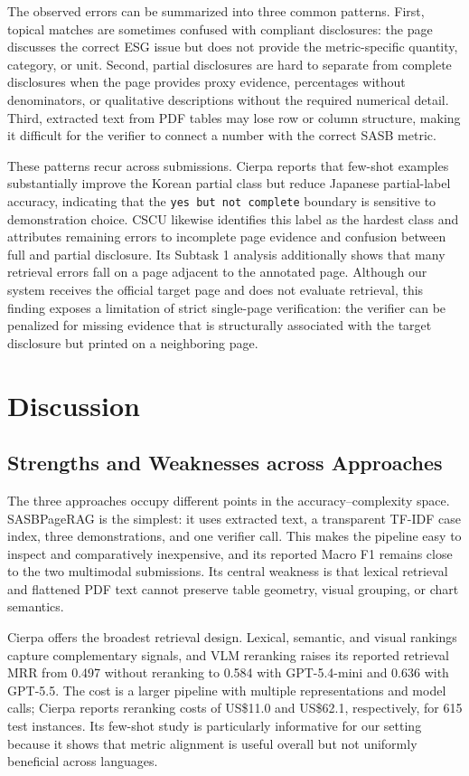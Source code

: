 \documentclass[sigconf,article]{acmart}
\newcommand{\SASBPageRAG}{SASB\-Page\-RAG}
\begin{document}
The observed errors can be summarized into three common patterns. First, topical matches are sometimes confused with compliant disclosures: the page discusses the correct ESG issue but does not provide the metric-specific quantity, category, or unit. Second, partial disclosures are hard to separate from complete disclosures when the page provides proxy evidence, percentages without denominators, or qualitative descriptions without the required numerical detail. Third, extracted text from PDF tables may lose row or column structure, making it difficult for the verifier to connect a number with the correct SASB metric.

These patterns recur across submissions. Cierpa reports that few-shot examples substantially improve the Korean partial class but reduce Japanese partial-label accuracy, indicating that the \texttt{yes but not complete} boundary is sensitive to demonstration choice. CSCU likewise identifies this label as the hardest class and attributes remaining errors to incomplete page evidence and confusion between full and partial disclosure. Its Subtask 1 analysis additionally shows that many retrieval errors fall on a page adjacent to the annotated page. Although our system receives the official target page and does not evaluate retrieval, this finding exposes a limitation of strict single-page verification: the verifier can be penalized for missing evidence that is structurally associated with the target disclosure but printed on a neighboring page.

\section{Discussion}
\subsection{Strengths and Weaknesses across Approaches}
The three approaches occupy different points in the accuracy--complexity space. \SASBPageRAG{} is the simplest: it uses extracted text, a transparent TF-IDF case index, three demonstrations, and one verifier call. This makes the pipeline easy to inspect and comparatively inexpensive, and its reported Macro F1 remains close to the two multimodal submissions. Its central weakness is that lexical retrieval and flattened PDF text cannot preserve table geometry, visual grouping, or chart semantics.

Cierpa offers the broadest retrieval design. Lexical, semantic, and visual rankings capture complementary signals, and VLM reranking raises its reported retrieval MRR from 0.497 without reranking to 0.584 with GPT-5.4-mini and 0.636 with GPT-5.5. The cost is a larger pipeline with multiple representations and model calls; Cierpa reports reranking costs of US\$11.0 and US\$62.1, respectively, for 615 test instances. Its few-shot study is particularly informative for our setting because it shows that metric alignment is useful overall but not uniformly beneficial across languages.
\end{document}
